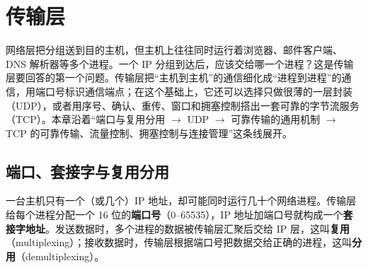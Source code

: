 \section{传输层}

网络层把分组送到目的主机，但主机上往往同时运行着浏览器、邮件客户端、DNS 解析器等多个进程。一个 IP 分组到达后，应该交给哪一个进程？这是传输层要回答的第一个问题。传输层把“主机到主机”的通信细化成“进程到进程”的通信，用端口号标识通信端点；在这个基础上，它还可以选择只做很薄的一层封装（UDP），或者用序号、确认、重传、窗口和拥塞控制搭出一套可靠的字节流服务（TCP）。本章沿着“端口与复用分用 $\to$ UDP $\to$ 可靠传输的通用机制 $\to$ TCP 的可靠传输、流量控制、拥塞控制与连接管理”这条线展开。

\subsection{端口、套接字与复用分用}

一台主机只有一个（或几个）IP 地址，却可能同时运行几十个网络进程。传输层给每个进程分配一个 16 位的\textbf{端口号}（0--65535），IP 地址加端口号就构成一个\textbf{套接字地址}。发送数据时，多个进程的数据被传输层汇聚后交给 IP 层，这叫\textbf{复用}（multiplexing）；接收数据时，传输层根据端口号把数据交给正确的进程，这叫\textbf{分用}（demultiplexing）。

